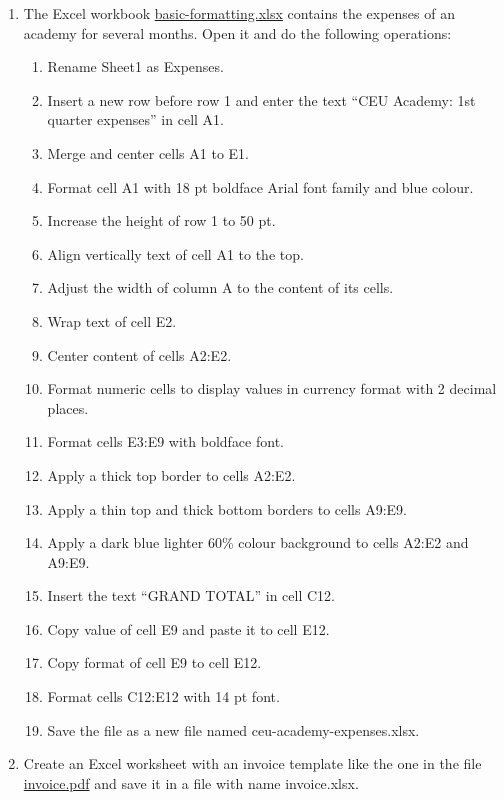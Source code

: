 \begin{enumerate}[leftmargin=*]
\item \label{ex-basic-formatting}The Excel workbook 
\href{http://aprendeconalf.es/office/excel/exercises/introduction/basic-formatting.xlsx}{\textsf{basic-formatting.xlsx}}
contains the expenses of an academy for several months.
Open it and do the following operations:
\begin{enumerate}
\item Rename \textsf{Sheet1} as \textsf{Expenses}.
\item Insert a new row before row 1 and enter the text ``CEU Academy: 1st quarter expenses'' in cell A1.
\item Merge and center cells A1 to E1.
\item Format cell A1 with 18 pt boldface Arial font family and blue colour.
\item Increase the height of row 1 to 50 pt.
\item Align vertically text of cell A1 to the top.
\item Adjust the width of column A to the content of its cells.
\item Wrap text of cell E2.
\item Center content of cells A2:E2.
\item Format numeric cells to display values in currency format with 2 decimal places.
\item Format cells E3:E9 with boldface font.
\item Apply a thick top border to cells A2:E2.
\item Apply a thin top and thick bottom borders to cells A9:E9.
\item Apply a dark blue lighter 60\% colour background to cells A2:E2 and A9:E9.
\item Insert the text ``GRAND TOTAL'' in cell C12.
\item Copy value of cell E9 and paste it to cell E12.
\item Copy format of cell E9 to cell E12. 
\item Format cells C12:E12 with 14 pt font.
\item Save the file as a new file named \textsf{ceu-academy-expenses.xlsx}.
\end{enumerate}

\item\label{ex-invoice-template} Create an Excel worksheet with an invoice template like the one in the file
\href{http://aprendeconalf.es/office/excel/exercises/introduction/invoice.pdf}{\textsf{invoice.pdf}} and save it in a file with name \textsf{invoice.xlsx}.



\end{enumerate}
